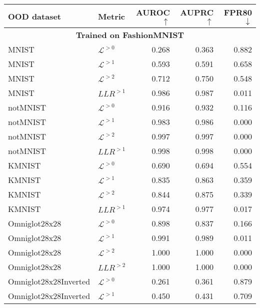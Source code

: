 {\begin{table}[t]
    \centering
    \begin{tabular}{llrrr}
        \toprule
         OOD dataset & Metric & AUROC$\uparrow$ & AUPRC$\uparrow$ & FPR80$\downarrow$ \\
         \midrule
         \multicolumn{5}{c}{\textbf{Trained on FashionMNIST}} \\
         \midrule
MNIST                    & $\mathcal{L}^{>0}$     &  0.268  &  0.363  &  0.882 \\
MNIST                    & $\mathcal{L}^{>1}$     &  0.593  &  0.591  &  0.658 \\
MNIST                    & $\mathcal{L}^{>2}$     &  0.712  &  0.750  &  0.548 \\
MNIST                    & $LLR^{>1}$             &  0.986  &  0.987  &  0.011 \\
\midrule
notMNIST                 &  $\mathcal{L}^{>0}$    &  0.916  &  0.932  &  0.116 \\
notMNIST                 &  $\mathcal{L}^{>1}$    &  0.983  &  0.986  &  0.000 \\
notMNIST                 &  $\mathcal{L}^{>2}$    &  0.997  &  0.997  &  0.000 \\
notMNIST                 &  $LLR^{>1}$            &  0.998  &  0.998  &  0.000 \\
\midrule
KMNIST                   &  $\mathcal{L}^{>0}$    &  0.690  &  0.694  &  0.554 \\
KMNIST                   &  $\mathcal{L}^{>1}$    &  0.835  &  0.863  &  0.359 \\
KMNIST                   &  $\mathcal{L}^{>2}$    &  0.844  &  0.875  &  0.339 \\
KMNIST                   &  $LLR^{>1}$            &  0.974  &  0.977  &  0.017 \\
\midrule
Omniglot28x28            &  $\mathcal{L}^{>0}$    &  0.898  &  0.837  &  0.166 \\
Omniglot28x28            &  $\mathcal{L}^{>1}$    &  0.991  &  0.989  &  0.011 \\
Omniglot28x28            &  $\mathcal{L}^{>2}$    &  1.000  &  1.000  &  0.000 \\
Omniglot28x28            &  $LLR^{>2}$            &  1.000  &  1.000  &  0.000 \\
\midrule
Omniglot28x28Inverted    &  $\mathcal{L}^{>0}$    &  0.261  &  0.361  &  0.879 \\
Omniglot28x28Inverted    &  $\mathcal{L}^{>1}$    &  0.450  &  0.431  &  0.709 \\

\end{tabular}
\end{table}}
